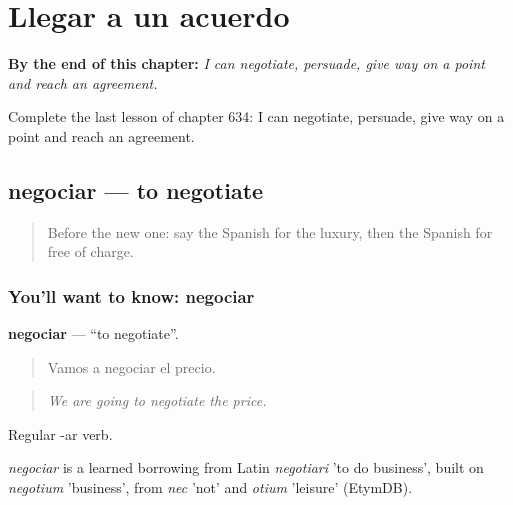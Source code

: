 
\chapter{Llegar a un acuerdo}
\label{ch:es-llegar-a-un-acuerdo}

\begin{chapteropening}
\textbf{By the end of this chapter:} \emph{I can negotiate, persuade, give way on a point and reach an agreement.}

Complete the last lesson of chapter 634: I can negotiate, persuade, give way on a point and reach an agreement.
\end{chapteropening}

\section[negociar]{negociar — to negotiate}

\label{lesson:ES-C634-negociar}



\begin{quote}
Before the new one: say the Spanish for the luxury, then the Spanish for free of charge.
\end{quote}

\subsection*{You'll want to know: negociar}
\textbf{negociar} — \textquotedblleft{}to negotiate\textquotedblright{}.

\begin{quote}
Vamos a negociar el precio.
\end{quote}

\begin{quote}
\emph{We are going to negotiate the price.}
\end{quote}

Regular -ar verb.

\begin{cousinweb}
\emph{negociar} is a learned borrowing from Latin \emph{negotiari} 'to do business', built on \emph{negotium} 'business', from \emph{nec} 'not' and \emph{otium} 'leisure' (EtymDB).
\end{cousinweb}

